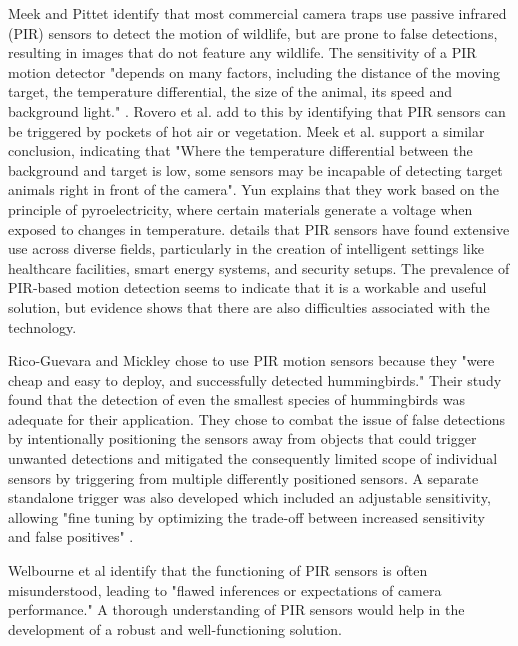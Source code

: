 \documentclass[class=report,11pt,crop=false]{standalone}
\begin{document}
Meek and Pittet \cite{meek2012user} identify that most commercial camera traps use passive infrared (PIR) sensors to detect the motion of wildlife, but are prone to false detections, resulting in images that do not feature any wildlife. The sensitivity of a PIR motion detector "depends on many factors, including the distance of the moving target, the temperature differential, the size of the animal, its speed and background light." \cite{meek2012user}. Rovero et al. \cite{rovero2013which} add to this by identifying that PIR sensors can be triggered by pockets of hot air or vegetation. Meek et al. \cite{meek2012introduction} support a similar conclusion, indicating that "Where the temperature differential between the background and target is low, some sensors may be incapable of detecting target animals right in front of the camera". Yun \cite{yun2014detecting} explains that they work based on the principle of pyroelectricity, where certain materials generate a voltage when exposed to changes in temperature. \cite{amusa2015pyro} details that PIR sensors have found extensive use across diverse fields, particularly in the creation of intelligent settings like healthcare facilities, smart energy systems, and security setups.
The prevalence of PIR-based motion detection seems to indicate that it is a workable and useful solution, but evidence shows that there are also difficulties associated with the technology.

Rico-Guevara and Mickley \cite{rico-guevara2017bring} chose to use PIR motion sensors because they "were cheap and easy to deploy, and successfully detected hummingbirds." Their study found that the detection of even the smallest species of hummingbirds was adequate for their application. They chose to combat the issue of false detections by intentionally positioning the sensors away from objects that could trigger unwanted detections and mitigated the consequently limited scope of individual sensors by triggering from multiple differently positioned sensors. A separate standalone trigger was also developed which included an adjustable sensitivity, allowing "fine tuning by optimizing the trade-off between increased sensitivity and false positives" \cite{rico-guevara2017bring}.

Welbourne et al \cite{welbourne2016how} identify that the functioning of PIR sensors is often misunderstood, leading to "flawed inferences or expectations of camera performance." A thorough understanding of PIR sensors would help in the development of a robust and well-functioning solution.
\end{document}
